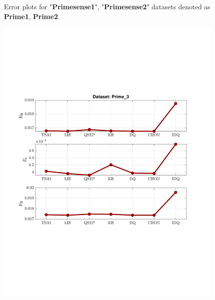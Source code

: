 \documentclass[a4paper]{report}
\begin{document}
\begin{figure}
\caption{Error plots for "\textbf{Primesense{\textunderscore}1}", "\textbf{Primesense{\textunderscore}2}" datasets denoted as \textbf{Prime{\textunderscore}1}, \textbf{Prime{\textunderscore}2}.}
\end{figure}

\begin{figure}
\centering
\includegraphics[scale=0.7]{./hand_eye_figures/real/Result_Prime_3}

\end{figure}
\end{document}
